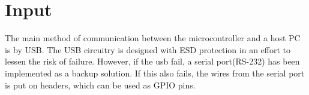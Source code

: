 \documentclass[../main/report.tex]{subfiles}
\begin{document}
\section{Input}

The main method of communication between the microcontroller and a host PC is by USB.
The USB circuitry is designed with ESD protection in an effort to lessen the risk of failure. 
However, if the usb fail, a serial port(RS-232) has been implemented as a backup solution.
If this also fails, the wires from the serial port is put on headers, which can be used as GPIO pins.

\end{document}
